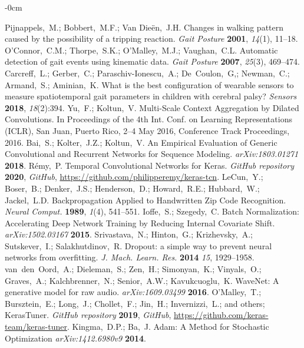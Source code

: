 \documentclass[sensors,article,submit,pdftex,moreauthors]{Definitions/mdpi}
\begin{document}
\begin{adjustwidth}{-\extralength}{0cm}
\begin{thebibliography}{999}
	Pijnappels,~M.; Bobbert,~M.F.; Van Die\"{e}n,~J.H. Changes in walking pattern caused by the possibility of a tripping reaction. {\em Gait Posture} {\bf 2001}, {\em 14}(1), 11--18.
	O'Connor,~C.M.; Thorpe,~S.K.; O'Malley,~M.J.; Vaughan,~C.L. Automatic detection of gait events using kinematic data. {\em Gait Posture} {\bf 2007}, {\em 25}(3), 469--474.
	Carcreff,~L.; Gerber,~C.; Paraschiv-Ionescu,~A.; De~Coulon,~G,; Newman,~C.; Armand,~S.; Aminian,~K. What is the best configuration of wearable sensors
	to measure spatiotemporal gait parameters in children with cerebral palsy? {\em Sensors} {\bf 2018}, {\em 18}(2):394.
	Yu,~F.; Koltun,~V. Multi-Scale Context Aggregation by Dilated Convolutions. In Proceedings of the 4th Int. Conf. on Learning Representations (ICLR), San Juan, Puerto Rico, 2--4 May 2016, Conference Track Proceedings, 2016.
	Bai,~S.; Kolter,~J.Z.; Koltun,~V. An Empirical Evaluation of Generic Convolutional and Recurrent Networks for Sequence Modeling. {\em arXiv:1803.01271} {\bf 2018}.
	R\'{e}my,~P. Temporal Convolutional Networks for Keras. {\em GitHub repository} {\bf 2020}, {\em GitHub}, \url{https://github.com/philipperemy/keras-tcn}.
	LeCun,~Y.; Boser,~B.; Denker,~J.S.; Henderson,~D.; Howard,~R.E.; Hubbard,~W.; Jackel,~L.D. Backpropagation Applied to Handwritten Zip Code Recognition. {\em Neural Comput.} {\bf 1989}, {\em 1}(4), 541--551.
	Ioffe,~S.; Szegedy,~C. Batch Normalization: Accelerating Deep Network Training by
	Reducing Internal Covariate Shift. {\em arXiv:1502.03167} {\bf 2015}.
	Srivastava,~N.; Hinton,~G.; Krizhevsky,~A.; Sutskever,~I.; Salakhutdinov,~R. Dropout: a
	simple way to prevent neural networks from overfitting. {\em J. Mach. Learn. Res.} {\bf 2014} {\em 15}, 1929--1958.
	van~den~Oord,~A.; Dieleman,~S.; Zen,~H.; Simonyan,~K.; Vinyals,~O.; Graves,~A.; Kalchbrenner,~N.; Senior,~A.W.; Kavukcuoglu,~K. WaveNet: A generative	model for raw audio. {\em arXiv:1609.03499} {\bf 2016}.
	O'Malley,~T.; Bursztein,~E.; Long,~J.; Chollet,~F.; Jin,~H.; Invernizzi,~L.; and others; KerasTuner. {\em GitHub repository} {\bf 2019}, {\em GitHub}, \url{https://github.com/keras-team/keras-tuner}.
	Kingma,~D.P.; Ba,~J. Adam: A Method for Stochastic Optimization {\em arXiv:1412.6980v9} {\bf 2014}.

\end{thebibliography}
\end{adjustwidth}
\end{document}
